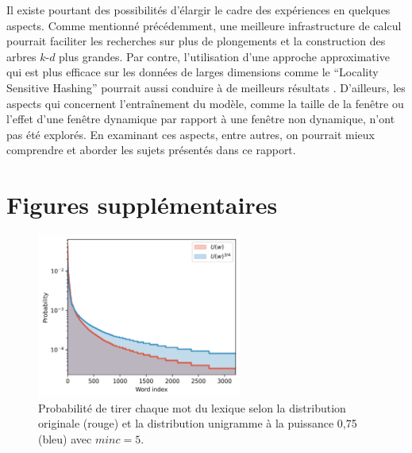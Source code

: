 \documentclass[12pt]{article}
\begin{document}
Il existe pourtant des possibilités d'élargir le cadre des expériences en quelques aspects. Comme mentionné précédemment, une meilleure infrastructure de calcul pourrait faciliter les recherches sur plus de plongements et la construction des arbres $k$-$d$ plus grandes. Par contre, l'utilisation d'une approche approximative qui est plus efficace sur les données de larges dimensions comme le ``Locality Sensitive Hashing'' pourrait aussi conduire à de meilleurs résultats \citep{andoni2008near}. D'ailleurs, les aspects qui concernent l'entraînement du modèle, comme la taille de la fenêtre ou l'effet d'une fenêtre dynamique par rapport à une fenêtre non dynamique, n'ont pas été explorés. En examinant ces aspects, entre autres, on pourrait mieux comprendre et aborder les sujets présentés dans ce rapport. 

\newpage


 

\appendix
\section{Figures supplémentaires}

\begin{figure}[htpb]
    \centering
    \includegraphics[width=0.6\textwidth]{img/unigram.png}
    \caption{Probabilité de tirer chaque mot du lexique selon la distribution originale (rouge) et la distribution unigramme à la puissance 0{,}75 (bleu) avec $minc = 5$.}
    \label{fig:unigram}
\end{figure}
\end{document}
